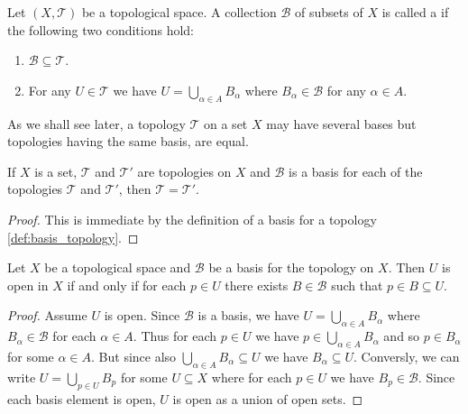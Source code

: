 \begin{definition}
	Let $(X,\mathcal{T})$ be a topological space. A collection $\mathcal{B}$ of subsets of $X$ is called a  if the following two conditions hold:

	\begin{enumerate}
		\item $\mathcal{B} \subseteq \mathcal{T}$.
		\item For any $U \in \mathcal{T}$ we have $U = \bigcup_{\alpha \in A} B_\alpha$ where $B_\alpha \in \mathcal{B}$ for any $\alpha \in A$.
	\end{enumerate}
	\label{def:basis_topology}
\end{definition}

As we shall see later, a topology $\mathcal{T}$ on a set $X$ may have several bases but topologies having the same basis, are equal.

\begin{corollary}	
	If $X$ is a set, $\mathcal{T}$ and $\mathcal{T}'$ are topologies on $X$ and $\mathcal{B}$ is a basis for each  of the topologies $\mathcal{T}$ and $\mathcal{T}'$, then $\mathcal{T} = \mathcal{T}'$.
	\label{cor:topology_unique}
\end{corollary}

\begin{proof}
	This is immediate by the definition of a basis for a topology \ref{def:basis_topology}.
\end{proof}

\begin{proposition}
	Let $X$ be a topological space and $\mathcal{B}$ be a basis for the topology on $X$. Then $U$ is open in $X$ if and only if for each $p \in U$ there exists $B \in \mathcal{B}$ such that $p \in B \subseteq U$.
	\label{prop:basis_criterion}
\end{proposition}

\begin{proof}
	Assume $U$ is open. Since $\mathcal{B}$ is a basis, we have $U = \bigcup_{\alpha \in A} B_\alpha$ where $B_\alpha \in \mathcal{B}$ for each $\alpha \in A$. Thus for each $p \in U$ we have $p \in \bigcup_{\alpha \in A} B_\alpha$ and so $p \in B_\alpha$ for some $\alpha \in A$. But since also $\bigcup_{\alpha \in A} B_\alpha \subseteq U$ we have $B_\alpha \subseteq U$. Conversly, we can write $U = \bigcup_{p \in U} B_p$ for some $U \subseteq X$ where for each $p \in U$ we have $B_p \in \mathcal{B}$. Since each basis element is open, $U$ is open as a union of open sets.
\end{proof}

